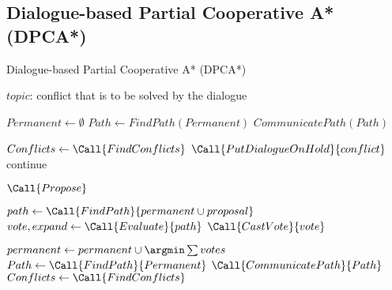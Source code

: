 \subsection{Dialogue-based Partial Cooperative A* (DPCA*)}

\begin{algorithm}[t]
    \caption{Dialogue-based Partial Cooperative A* (DPCA*)}
    \label{alg:dpca}
    \begin{algorithmic}[1]
        \Require $topic$: conflict that is to be solved by the dialogue
        
        \State $Permanent \gets \emptyset$
        \State $Path \gets FindPath(Permanent)$
        \State $CommunicatePath(Path)$
        
        \State $Conflicts \gets \Call{FindConflicts}$
                \State $\Call{PutDialogueOnHold}{conflict}$
                \State continue
             \EndIf
        
            \Repeat
                \State $\Call{Propose}$
                
            
            \State $path \gets \Call{FindPath}{permanent \cup proposal}$
            \State $vote, expand \gets \Call{Evaluate}{path}$
            \State $\Call{CastVote}{vote}$
            \EndFor
        
            
            \State $permanent \gets permanent \cup {\argmin \sum votes}$
            \State $Path \gets \Call{FindPath}{Permanent}$
            \State $\Call{CommunicatePath}{Path}$
            \State $Conflicts \gets \Call{FindConflicts}$
        \EndFor
    \end{algorithmic}
\end{algorithm}


